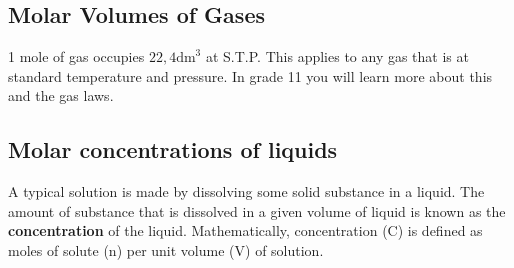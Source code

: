             \subsection{ Molar Volumes of Gases}
            \nopagebreak
            \par
            \label{m38712*eip-id1168064596799}
  { \label{m38712*eip-id1168053572222}1 mole of gas occupies $22,4{\mathrm{dm}}^{3}$ at S.T.P. } 
      \label{m38712*id282112}This applies to any gas that is at standard temperature and pressure. In grade 11 you will learn more about this and the gas laws.\par 
    \label{m38712*cid8}
            \subsection{ Molar concentrations of liquids}
            \nopagebreak
      \label{m38712*id282848}A typical solution is made by dissolving some solid substance in a liquid. The amount of substance that is dissolved in a given volume of liquid is known as the \textbf{concentration} of the liquid. Mathematically, concentration (C) is defined as moles of solute (n) per unit volume (V) of solution.\par 
      \label{m38712*id282860}\nopagebreak\noindent{}
        
